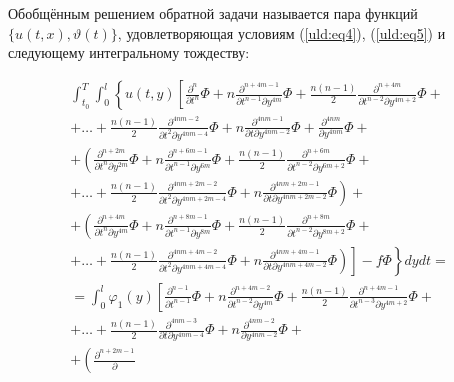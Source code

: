 \begin{definition}
Обобщённым решением обратной задачи
называется пара функций $\{ u (t , x) , \vartheta  (t)\}$, удовлетворяющая условиям (\ref{uld:eq4}), (\ref{uld:eq5}) и
следующему интегральному тождеству:
\end{definition}
\begin{multline*}
\int_{t_0}^T \int_0^l \left\{ u (t , y)  \left[
\frac{\partial^n}{\partial  t^n} \Phi + n  \frac{\partial^{
n+4 m-1}}{\partial  t^{ n-1} \partial  y^{4 m}} \Phi +\frac{n
(n-1)}{2} \frac{\partial^{ n+4 m}}{\partial  t^{ n-2} \partial
 y^{4 m+2}} \Phi +\right. \right. 
\\
+ \ldots +\frac{n (n-1)}{2} \frac{\partial^{ 4 n m-2}}{\partial  t^2 \partial  y^{ 4 n m-4}} \Phi
+n   \frac{\partial^{ 4  n m-1}}{\partial  t  \partial  y^{ 4 n m-2}} \Phi + \frac{\partial^{ 4  n m}}{\partial
 y^{4 n m}}  \Phi +
\\
+ \left( \frac{\partial^{ n+2 m}}{\partial  t^n \partial
 y^{ 2 m}} \Phi +n  \frac{\partial ^{ n+6 m-1}}{\partial
 t^{ n-1} \partial  y^{ 6 m}} \Phi
+\frac{n (n-1)}{2} \frac{\partial ^{ n+6 m}}{\partial
 t^{ n-2} \partial  y^{ 6 m+2}} \Phi + \right.
\\
\left. + \ldots +\frac{n (n-1)}{2} \frac{\partial ^{ 4 n m+2
m-2}}{\partial  t^2 \partial  y^{ 4 n m+2 m-4}} \Phi + n
\frac{\partial^{ 4 n m+2 m-1}}{\partial  t  \partial
 y^{ 4 n m+2 m-2}} \Phi \right)+
\\
+ \left( \frac{\partial ^{ n+4 m}}{\partial
 t^n \partial  y^{ 4 m}} \Phi + n  \frac{\partial
^{ n+8 m-1}}{\partial  t^{ n-1} \partial  y^{ 8 m}} \Phi +\frac{n
(n-1)}{2} \frac{\partial^{ n+8 m}}{\partial  t^{ n-2} \partial
 y^{ 8 m+2}} \Phi +\right.
\\
\left. \left. \left. +
 \ldots +\frac{n (n-1)}{2} \frac{\partial
^{ 4 n m+4 m-2}}{\partial  t^2 \partial
 y^{ 4 n m+4 m-4}} \Phi + n   \frac{\partial
^{ 4 n m+4 m-1}}{\partial  t  \partial
 y^{ 4 n m+4 m-2}} \Phi \right) \right]-f \Phi \right\}  dy dt=
\\
=\int_0^l \varphi _1 (y)  \left[ \frac{\partial^{
n-1}}{\partial  t^{ n-1}} \Phi + n   \frac{\partial^{ n+4 m-2}}{\partial  t^{ n-2} \partial  y^{ 4 m}} \Phi +\frac{n
 (n-1)}{2} \frac{\partial^{ n+4 m-1}}{\partial  t^{ n-3} \partial  y^{ 4 m+2}} \Phi + \right.
\\
+  \ldots + \frac{n (n-1)}{2} \frac{\partial ^{ 4
 n m-3}}{\partial  t  \partial  y^{ 4 n m-4}} \Phi
+n   \frac{\partial ^{ 4  n m-2}}{ \partial
 y^{ 4 n m-2}} \Phi + 
\\
+  \left( \frac{\partial^{ n+2 m-1}}{\partial
}
\end{multline*}
